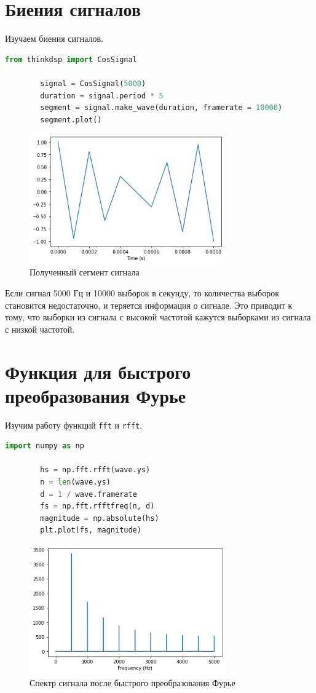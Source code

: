 \documentclass[a4paper, 12pt]{report}
\begin{document}
	\chapter{Биения сигналов}
	Изучаем биения сигналов.
	\begin{lstlisting}[language=Python,caption=Построение косинусоиды с высокой частотой]
		from thinkdsp import CosSignal

		signal = CosSignal(5000)
		duration = signal.period * 5
		segment = signal.make_wave(duration, framerate = 10000)
		segment.plot()
	\end{lstlisting}
	\begin{figure}[H]
		\centering
		\includegraphics[width=0.75\textwidth]{aliasing1.png}
		\caption{Полученный сегмент сигнала}
		\label{fig:aliasing1}
	\end{figure}
	Если сигнал 5000 Гц и 10000 выборок в секунду, то количества выборок становится недостаточно, и теряется информация о сигнале. Это приводит к тому, что выборки из сигнала с высокой частотой кажутся выборками из сигнала с низкой частотой.

	\chapter{Функция для быстрого преобразования Фурье}
	Изучим работу функций \texttt{fft} и \texttt{rfft}.
	\begin{lstlisting}[language=Python,caption=Функция для быстрого преобразования Фурье]
		import numpy as np

		hs = np.fft.rfft(wave.ys)
		n = len(wave.ys)
		d = 1 / wave.framerate
		fs = np.fft.rfftfreq(n, d)
		magnitude = np.absolute(hs)
		plt.plot(fs, magnitude)
	\end{lstlisting}
	\begin{figure}[H]
		\centering
		\includegraphics[width=0.75\textwidth]{spectrum1.png}
		\caption{Спектр сигнала после быстрого преобразования Фурье}
		\label{fig:spectrum1}
	\end{figure}
\end{document}
